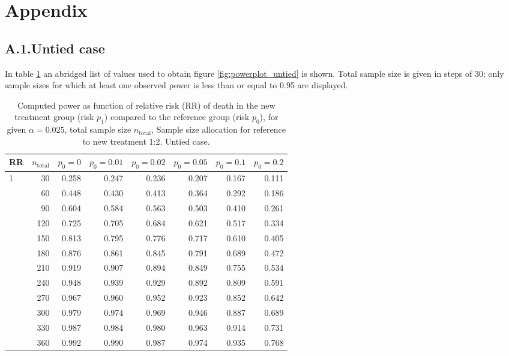 \documentclass[bimj,fleqn]{w-art}\usepackage[]{graphicx}\usepackage[]{color}
\theoremstyle{plain}
\theoremstyle{definition}
\begin{document}
\section*{Appendix}
\subsection*{A.1.\enspace Untied case}
In table \ref{tab:AppendixUntied} an abridged list of values used to obtain
figure \ref{fig:powerplot_untied} is shown. Total sample size is given in steps
of 30; only sample sizes for which at least one observed power is less than or
equal to 0.95 are displayed.
\begin{table}[ht]
\centering
\caption{Computed power as function of relative risk
             (RR) of death in the new treatment group (risk $p_1$) compared to
             the reference group (risk $p_0$), for given $\alpha =0.025$,
             total sample size $n_{\text{total}}$, Sample size allocation for
             reference to new treatment 1:2. Untied case.} 
\label{tab:AppendixUntied}
\begin{tabular}{lrrrrrrr}
  \hline
RR & $n_{\text{total}}$ & $p_0 = 0$ & $p_0 = 0.01$ & $p_0 = 0.02$ & $p_0 = 0.05$ & $p_0 = 0.1$ & $p_0 = 0.2$ \\ 
  \hline
1 & 30 & 0.258 & 0.247 & 0.236 & 0.207 & 0.167 & 0.111 \\ 
   & 60 & 0.448 & 0.430 & 0.413 & 0.364 & 0.292 & 0.186 \\ 
   & 90 & 0.604 & 0.584 & 0.563 & 0.503 & 0.410 & 0.261 \\ 
   & 120 & 0.725 & 0.705 & 0.684 & 0.621 & 0.517 & 0.334 \\ 
   & 150 & 0.813 & 0.795 & 0.776 & 0.717 & 0.610 & 0.405 \\ 
   & 180 & 0.876 & 0.861 & 0.845 & 0.791 & 0.689 & 0.472 \\ 
   & 210 & 0.919 & 0.907 & 0.894 & 0.849 & 0.755 & 0.534 \\ 
   & 240 & 0.948 & 0.939 & 0.929 & 0.892 & 0.809 & 0.591 \\ 
   & 270 & 0.967 & 0.960 & 0.952 & 0.923 & 0.852 & 0.642 \\ 
   & 300 & 0.979 & 0.974 & 0.969 & 0.946 & 0.887 & 0.689 \\ 
   & 330 & 0.987 & 0.984 & 0.980 & 0.963 & 0.914 & 0.731 \\ 
   & 360 & 0.992 & 0.990 & 0.987 & 0.974 & 0.935 & 0.768 \\ 

\end{tabular}
\end{table}
\end{document}
